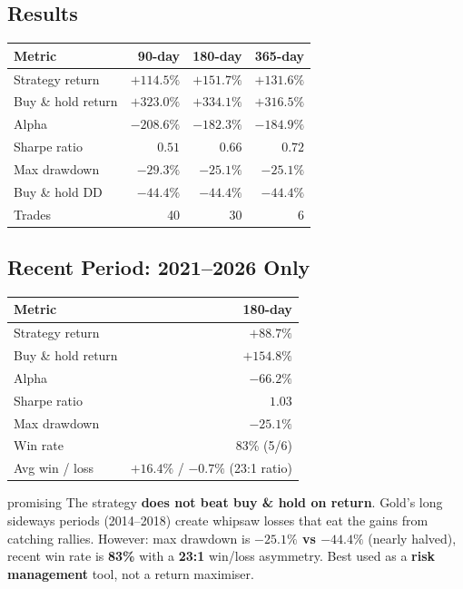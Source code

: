 \documentclass[11pt,a4paper]{article}
\begin{document}
\subsection{Results}

\vspace{0.5em}
\begin{tabular}{@{}lrrr@{}}
    \toprule
    \textbf{Metric} & \textbf{90-day} & \textbf{180-day} & \textbf{365-day} \\
    \midrule
    Strategy return    & $+114.5\%$ & $+151.7\%$ & $+131.6\%$ \\
    Buy \& hold return & $+323.0\%$ & $+334.1\%$ & $+316.5\%$ \\
    Alpha              & $-208.6\%$ & $-182.3\%$ & $-184.9\%$ \\
    Sharpe ratio       & $0.51$     & $0.66$     & $0.72$     \\
    Max drawdown       & $-29.3\%$  & $-25.1\%$  & $-25.1\%$  \\
    Buy \& hold DD     & $-44.4\%$  & $-44.4\%$  & $-44.4\%$  \\
    Trades             & 40         & 30         & 6          \\
    \bottomrule
\end{tabular}

\subsection{Recent Period: 2021--2026 Only}

\vspace{0.5em}
\begin{tabular}{@{}lr@{}}
    \toprule
    \textbf{Metric} & \textbf{180-day} \\
    \midrule
    Strategy return    & $+88.7\%$  \\
    Buy \& hold return & $+154.8\%$ \\
    Alpha              & $-66.2\%$  \\
    Sharpe ratio       & $1.03$     \\
    Max drawdown       & $-25.1\%$  \\
    Win rate           & 83\% (5/6) \\
    Avg win / loss     & $+16.4\%$ / $-0.7\%$ \quad (23:1 ratio) \\
    \bottomrule
\end{tabular}

\begin{resultbox}{promising}
The strategy \textbf{does not beat buy \& hold on return}. Gold's long
sideways periods (2014--2018) create whipsaw losses that eat the gains
from catching rallies. However: max drawdown is \textbf{$-25.1\%$ vs
$-44.4\%$} (nearly halved), recent win rate is \textbf{83\%} with a
\textbf{23:1} win/loss asymmetry. Best used as a \textbf{risk
management} tool, not a return maximiser.
\end{resultbox}
\end{document}
